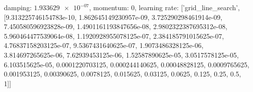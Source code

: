 damping: $\num[scientific-notation=true]{1.933629e-07}$, momentum: $\num[scientific-notation=false]{0}$, learning rate: ['grid_line_search', [9.313225746154783e-10, 1.862645149230957e-09, 3.725290298461914e-09, 7.450580596923828e-09, 1.4901161193847656e-08, 2.9802322387695312e-08, 5.960464477539064e-08, 1.1920928955078125e-07, 2.384185791015625e-07, 4.76837158203125e-07, 9.5367431640625e-07, 1.9073486328125e-06, 3.814697265625e-06, 7.62939453125e-06, 1.52587890625e-05, 3.0517578125e-05, 6.103515625e-05, 0.0001220703125, 0.000244140625, 0.00048828125, 0.0009765625, 0.001953125, 0.00390625, 0.0078125, 0.015625, 0.03125, 0.0625, 0.125, 0.25, 0.5, 1]]